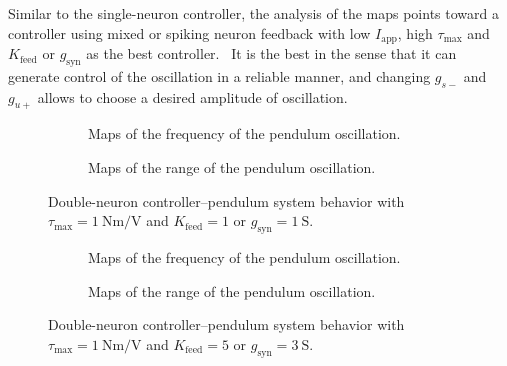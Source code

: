 Similar to the single-neuron controller, the analysis of the maps points toward a controller using mixed or spiking neuron feedback with low $I_\text{app}$, high $\tau_\text{max}$ and $K_\text{feed}$ or $g_\text{syn}$ as the best controller. 
It is the best in the sense that it can generate control of the oscillation in a reliable manner, and changing $g_{s-}$ and $g_{u+}$ allows to choose a desired amplitude of oscillation.

\begin{figure}[!htbp]
    \centering
    \begin{subfigure}[t][.46\textheight][b]{\textwidth}
        \centering
        \caption{Maps of the frequency of the pendulum oscillation.}
        \label{fig:double_t1_low_freq}
    \end{subfigure}
    
    \begin{subfigure}[b][.46\textheight][t]{\textwidth}
        \centering
        \caption{Maps of the range of the pendulum oscillation.}
        \label{fig:double_t1_low_range}
    \end{subfigure}
    \caption{Double-neuron controller–pendulum system behavior with $\tau_\text{max} = \qty{1}{\newton\meter\per\volt}$ and $K_\text{feed} = 1$ or $g_{\text{syn}} = \qty{1}{\siemens}$.}
    \label{fig:double_t1_low}
\end{figure}

\begin{figure}[!htbp]
    \centering
    \begin{subfigure}[t][.46\textheight][b]{\textwidth}
        \centering
        \caption{Maps of the frequency of the pendulum oscillation.}
        \label{fig:double_t1_high_freq}  
    \end{subfigure}
    
    \begin{subfigure}[b][.46\textheight][t]{\textwidth}
        \centering
        \caption{Maps of the range of the pendulum oscillation.}
        \label{fig:double_t1_high_range}  
    \end{subfigure}
    \caption{Double-neuron controller–pendulum system behavior with $\tau_\text{max} = \qty{1}{\newton\meter\per\volt}$ and $K_\text{feed} = 5$ or $g_{\text{syn}} = \qty{3}{\siemens}$.}
    \label{fig:double_t1_high}
\end{figure}

